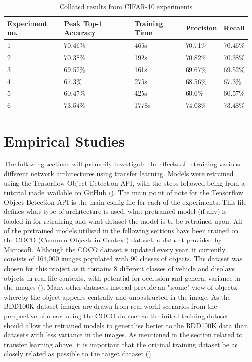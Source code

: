 \documentclass[12pt]{report}
\begin{document}
\begin{table}[th!]
\begin{tabular}{|l|l|l|l|l|}
\hline
Experiment no. & Peak Top-1 Accuracy & Training Time & Precision & Recall  \\ \hline
1              & 70.46\%             & 466s          & 70.71\%   & 70.46\% \\ \hline
2              & 70.38\%             & 192s          & 70.82\%   & 70.38\% \\ \hline
3              & 69.52\%             & 161s          & 69.67\%   & 69.52\% \\ \hline
4              & 67.3\%              & 276s          & 68.56\%   & 67.3\%  \\ \hline
5              & 60.47\%             & 425s          & 60.6\%    & 60.57\% \\ \hline
6              & 73.54\%             & 1778s         & 74.03\%   & 73.48\% \\ \hline
\end{tabular}
\caption{Collated results from CIFAR-10 experiments}
\label{cifar-results}
\end{table}

\newpage
\chapter{Empirical Studies}
\begin{flushleft}
The following sections will primarily investigate the effects of retraining various different network architectures using transfer learning. Models were retrained using the Tensorflow Object Detection API, with the steps followed being from a tutorial made available on GitHub (\cite{tutorial}). The main point of note for the Tensorflow Object Detection API is the main config file for each of the experiments. This file defines what type of architecture is used, what pretrained model (if any) is loaded in for retraining and what dataset the model is to be retrained upon. All of the pretrained models utilised in the following sections have been trained on the COCO (Common Objects in Context) dataset, a dataset provided by Microsoft. Although the COCO dataset is updated every year, it currently consists of 164,000 images populated with 90 classes of objects. The dataset was chosen for this project as it contains 8 different classes of vehicle and displays objects in real-life contexts, with potential for occlusion and general variance in the images (\cite{lin2014microsoft}). Many other datasets instead provide an "iconic" view of objects, whereby the object appears centrally and unobstructed in the image. As the BDD100K dataset images are drawn from real-world scenarios from the perspective of a car, using the COCO dataset as the initial training dataset should allow the retrained models to generalise better to the BDD100K data than datasets with less variance in the images. As mentioned in the section related to transfer learning above, it is important that the original training dataset be as closely related as possible to the target dataset (\cite{tan2018survey}).
\end{flushleft}
\end{document}
